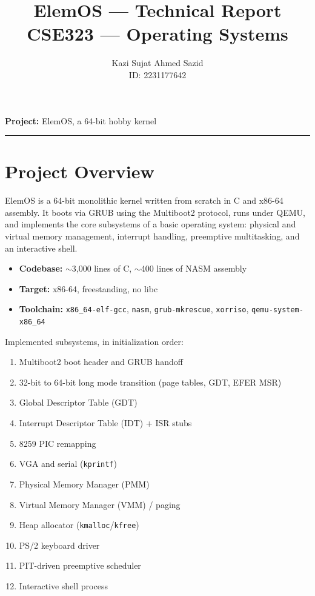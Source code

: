 \documentclass[12pt,a4paper]{article}
\title{
    \textbf{ElemOS --- Technical Report} \\[0.5em]
    \large CSE323 --- Operating Systems
}
\author{
    Kazi Sujat Ahmed Sazid \\
    ID: 2231177642
}
\date{}
\begin{document}
\maketitle
\thispagestyle{empty}
\vspace{0.5em}
\noindent\textbf{Project:} ElemOS, a 64-bit hobby kernel

\hrule
\vspace{1em}

\tableofcontents
\newpage

\section{Project Overview}

ElemOS is a 64-bit monolithic kernel written from scratch in C and x86-64 assembly. It boots via GRUB using the Multiboot2 protocol, runs under QEMU, and implements the core subsystems of a basic operating system: physical and virtual memory management, interrupt handling, preemptive multitasking, and an interactive shell.

\begin{itemize}
    \item \textbf{Codebase:} $\sim$3,000 lines of C, $\sim$400 lines of NASM assembly
    \item \textbf{Target:} x86-64, freestanding, no libc
    \item \textbf{Toolchain:} \texttt{x86\_64-elf-gcc}, \texttt{nasm}, \texttt{grub-mkrescue}, \texttt{xorriso}, \texttt{qemu-system-x86\_64}
\end{itemize}

Implemented subsystems, in initialization order:

\begin{enumerate}
    \item Multiboot2 boot header and GRUB handoff
    \item 32-bit to 64-bit long mode transition (page tables, GDT, EFER MSR)
    \item Global Descriptor Table (GDT)
    \item Interrupt Descriptor Table (IDT) + ISR stubs
    \item 8259 PIC remapping
    \item VGA and serial (\texttt{kprintf})
    \item Physical Memory Manager (PMM)
    \item Virtual Memory Manager (VMM) / paging
    \item Heap allocator (\texttt{kmalloc}/\texttt{kfree})
    \item PS/2 keyboard driver
    \item PIT-driven preemptive scheduler
    \item Interactive shell process
\end{enumerate}
\end{document}
